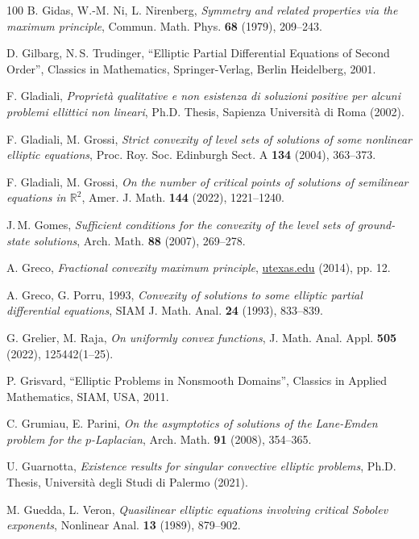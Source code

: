 \documentclass[11pt, reqno]{amsart}
\theoremstyle{definition}
\numberwithin{equation}{section}
\newcommand{\R}{\mathbb{R}}
\begin{document}
\begin{thebibliography}{100}
 B. Gidas, W.-M. Ni, L. Nirenberg, 
\emph{Symmetry and related properties via the maximum principle},
Commun. Math. Phys. \textbf{68} (1979), %
209--243.

 D. Gilbarg, N.$\,$S. Trudinger,
``Elliptic Partial Differential Equations of Second Order'',
Classics in Mathematics, Springer-Verlag, Berlin Heidelberg, 2001.

 F. Gladiali,
\emph{Proprietà qualitative e non esistenza di soluzioni positive per alcuni problemi ellittici non lineari},
Ph.D. Thesis, Sapienza Università di Roma (2002).

 F. Gladiali, M. Grossi,
\emph{Strict convexity of level sets of solutions of some nonlinear elliptic equations},
Proc. Roy. Soc. Edinburgh Sect. A \textbf{134} (2004), %
363--373.

 F. Gladiali, M. Grossi,
\emph{On the number of critical points of solutions of semilinear equations in $\R^2$},
Amer. J. Math. \textbf{144} (2022), %
 1221--1240.

 J.$\,$M. Gomes,
\emph{Sufficient conditions for the convexity of the level sets of ground-state solutions},
Arch. Math. \textbf{88} (2007), %
269--278.

 A. Greco,
\emph{Fractional convexity maximum principle},
\href{https://web.ma.utexas.edu/mp_arc/c/14/14-73.pdf?}{utexas.edu} (2014), pp. 12.

 A. Greco, G. Porru, 1993,
\emph{Convexity of solutions to some elliptic partial differential equations},
SIAM J. Math. Anal. \textbf{24} (1993), %
833--839.

 G. Grelier, M. Raja,
\emph{On uniformly convex functions},
J. Math. Anal. Appl. \textbf{505} (2022), %
125442(1--25).

 P. Grisvard,
``Elliptic Problems in Nonsmooth Domains'',
Classics in Applied Mathematics, SIAM, USA, 2011.

 C. Grumiau, E. Parini,
\emph{On the asymptotics of solutions of the Lane-Emden problem for the $p$-Laplacian},
Arch. Math. \textbf{91} (2008), 354--365.
 
 U. Guarnotta,
\emph{Existence results for singular convective elliptic problems},
Ph.D. Thesis, Università degli Studi di Palermo (2021).

 M. Guedda, L. Veron,
\emph{Quasilinear elliptic equations involving critical Sobolev exponents},
Nonlinear Anal. \textbf{13} (1989), %
879--902.


\end{thebibliography}
\end{document}
